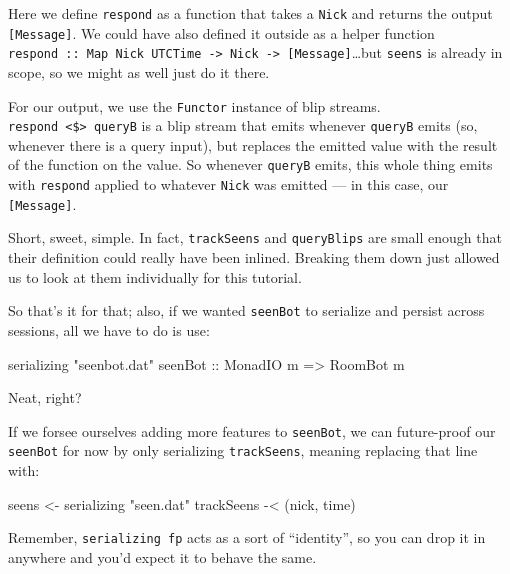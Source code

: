 \documentclass[]{article}
\newenvironment{Shaded}{}{}
\newcommand{\DataTypeTok}[1]{\textcolor[rgb]{0.56,0.13,0.00}{#1}}
\newcommand{\NormalTok}[1]{#1}
\newcommand{\OperatorTok}[1]{\textcolor[rgb]{0.40,0.40,0.40}{#1}}
\newcommand{\OtherTok}[1]{\textcolor[rgb]{0.00,0.44,0.13}{#1}}
\newcommand{\StringTok}[1]{\textcolor[rgb]{0.25,0.44,0.63}{#1}}
\begin{document}
Here we define \texttt{respond} as a function that takes a \texttt{Nick} and
returns the output \texttt{{[}Message{]}}. We could have also defined it outside
as a helper function
\texttt{respond\ ::\ Map\ Nick\ UTCTime\ -\textgreater{}\ Nick\ -\textgreater{}\ {[}Message{]}}\ldots but
\texttt{seens} is already in scope, so we might as well just do it there.

For our output, we use the \texttt{Functor} instance of blip streams.
\texttt{respond\ \textless{}\$\textgreater{}\ queryB} is a blip stream that
emits whenever \texttt{queryB} emits (so, whenever there is a query input), but
replaces the emitted value with the result of the function on the value. So
whenever \texttt{queryB} emits, this whole thing emits with \texttt{respond}
applied to whatever \texttt{Nick} was emitted --- in this case, our
\texttt{{[}Message{]}}.

Short, sweet, simple. In fact, \texttt{trackSeens} and \texttt{queryBlips} are
small enough that their definition could really have been inlined. Breaking them
down just allowed us to look at them individually for this tutorial.

So that's it for that; also, if we wanted \texttt{seenBot} to serialize and
persist across sessions, all we have to do is use:

\begin{Shaded}
\begin{Highlighting}[]
\NormalTok{serializing\textquotesingle{} }\StringTok{"seenbot.dat"}\OtherTok{ seenBot ::} \DataTypeTok{MonadIO}\NormalTok{ m }\OtherTok{=>} \DataTypeTok{RoomBot}\NormalTok{ m}
\end{Highlighting}
\end{Shaded}

Neat, right?

If we forsee ourselves adding more features to \texttt{seenBot}, we can
future-proof our \texttt{seenBot} for now by only serializing
\texttt{trackSeens}, meaning replacing that line with:

\begin{Shaded}
\begin{Highlighting}[]
\NormalTok{    seens }\OtherTok{<{-}}\NormalTok{ serializing\textquotesingle{} }\StringTok{"seen.dat"}\NormalTok{ trackSeens }\OperatorTok{{-}<}\NormalTok{ (nick, time)}
\end{Highlighting}
\end{Shaded}

Remember, \texttt{serializing\textquotesingle{}\ fp} acts as a sort of
``identity'', so you can drop it in anywhere and you'd expect it to behave the
same.
\end{document}
